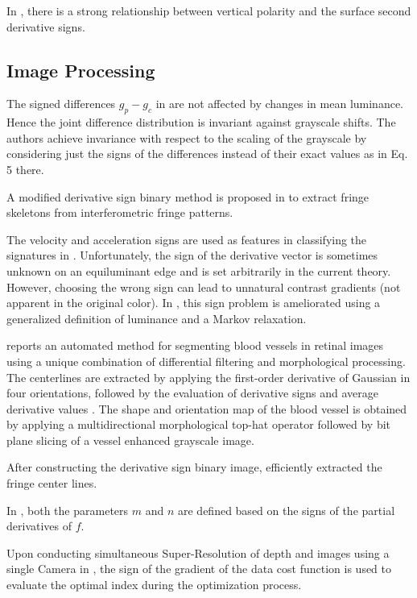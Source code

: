 \documentclass[11pt]{book}
\begin{document}
In \cite{shimokawa2019computational}, there is a strong relationship
between vertical polarity and the surface second derivative signs.


\subsection{Image Processing}

The signed differences $g_{p}-g_{c}$ in \cite{ojala2002multiresolution}
are not affected by changes in mean luminance. Hence the joint difference
distribution is invariant against grayscale shifts. The authors achieve
invariance with respect to the scaling of the grayscale by considering
just the signs of the differences instead of their exact values as
in Eq. 5 there.

A modified derivative sign binary method is proposed in \cite{zhang2002fringe}
to extract fringe skeletons from interferometric fringe patterns.

The velocity and acceleration signs are used as features in classifying
the signatures in \cite{herdaugdelen2004dynamic}. Unfortunately,
the sign of the derivative vector is sometimes unknown on an equiluminant
edge and is set arbitrarily in the current theory. However, choosing
the wrong sign can lead to unnatural contrast gradients (not apparent
in the original color). In \cite{drew2009improved}, this sign problem
is ameliorated using a generalized definition of luminance and a Markov
relaxation.

\cite{fraz2011retinal} reports an automated method for segmenting
blood vessels in retinal images using a unique combination of differential
filtering and morphological processing. The centerlines are extracted
by applying the first-order derivative of Gaussian in four orientations,
followed by the evaluation of derivative signs and average derivative
values . The shape and orientation map of the blood vessel is obtained
by applying a multidirectional morphological top-hat operator followed
by bit plane slicing of a vessel enhanced grayscale image.

After constructing the derivative sign binary image, \cite{el2012new}
efficiently extracted the fringe center lines.

In \cite{trujillo2013accurate}, both the parameters $m$ and $n$
are defined based on the signs of the partial derivatives of $f$.

Upon conducting simultaneous Super-Resolution of depth and images
using a single Camera in \cite{seok2013simultaneous}, the sign of
the gradient of the data cost function is used to evaluate the optimal
index during the optimization process.
\end{document}
